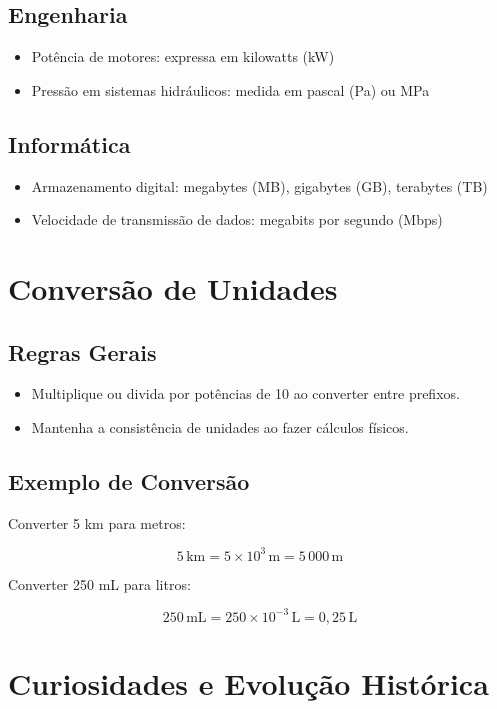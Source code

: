 \documentclass[portuguese,11pt,a4paper,oneside,onecolumn,notitlepage]{article}
\begin{document}
	\subsection*{Engenharia}
	\begin{itemize}
		\item Potência de motores: expressa em kilowatts (kW)
		\item Pressão em sistemas hidráulicos: medida em pascal (Pa) ou MPa
	\end{itemize}
	
	\subsection*{Informática}
	\begin{itemize}
		\item Armazenamento digital: megabytes (MB), gigabytes (GB), terabytes (TB)
		\item Velocidade de transmissão de dados: megabits por segundo (Mbps)
	\end{itemize}
	
	\section{Conversão de Unidades}
	
	\subsection*{Regras Gerais}
	\begin{itemize}
		\item Multiplique ou divida por potências de 10 ao converter entre prefixos.
		\item Mantenha a consistência de unidades ao fazer cálculos físicos.
	\end{itemize}
	
	\subsection*{Exemplo de Conversão}
	
	Converter 5 km para metros:
	
	\[
	5\, \text{km} = 5 \times 10^3\, \text{m} = 5\,000\, \text{m}
	\]
	
	Converter 250 mL para litros:
	
	\[
	250\, \text{mL} = 250 \times 10^{-3}\, \text{L} = 0{,}25\, \text{L}
	\]
	
	\section{Curiosidades e Evolução Histórica}
	
\end{document}
